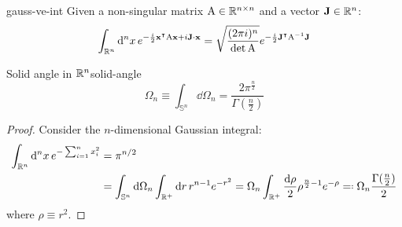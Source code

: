 \begin{lemma}{}{gauss-ve-int}
  Given a non-singular matrix $ \mathrm{A} \in \mathbb{R}^{n \times n} $ and a vector $ \mathbf{J} \in \mathbb{R}^n $:
  \begin{equation}
    \int_{\mathbb{R}^n} \mathrm{d}^nx\, e^{-\frac{i}{2} \mathbf{x}^\intercal \mathrm{A} \mathbf{x} + i \mathbf{J} \cdot \mathbf{x}} = \sqrt{\frac{(2\pi i)^n}{\det\mathrm{A}}} e^{-\frac{i}{2} \mathbf{J}^\intercal \mathrm{A}^{-1} \mathbf{J}}
  \end{equation}
\end{lemma}

\begin{proposition}[before upper = {\tcbtitle}]{Solid angle in $ \mathbb{R}^n $}{solid-angle}
  \begin{equation}
    \Omega_n \equiv \int_{\mathbb{S}^n} \dd \Omega_n = \frac{2\pi^{\frac{n}{2}}}{\Gamma(\frac{n}{2})}
    \label{eq:solid-angle}
  \end{equation}
\end{proposition}

\begin{proofbox}
  \begin{proof}
    Consider the $ n $-dimensional Gaussian integral:
    \begin{equation*}
      \begin{split}
        \int_{\R^n} \dd^nx \, e^{- \sum_{i = 1}^n x_i^2}
        & = \pi^{n/2} \\
        & = \int_{\mathbb{S}^n} \dd \Omega_n \int_{\R^+} \dd r \, r^{n - 1} e^{-r^2} = \Omega_n \int_{\R^+} \frac{\dd \rho}{2} \rho^{\frac{n}{2} - 1} e^{-\rho} \eqdef \Omega_n \frac{\Gamma(\frac{n}{2})}{2}
      \end{split}
    \end{equation*}
    where $ \rho \equiv r^2 $.
  \end{proof}
\end{proofbox}










